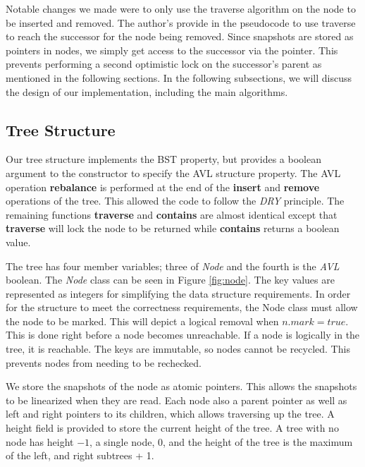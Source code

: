 \documentclass[conference]{IEEEtran}
\theoremstyle{definition}
\theoremstyle{theorem}
\begin{document}
Notable changes we made were to only use the traverse algorithm on the node to be inserted and removed. The author's provide in the pseudocode to use traverse to reach the successor for the node being removed. Since snapshots are stored as pointers in nodes, we simply get access to the successor via the pointer. This prevents performing a second optimistic lock on the successor's parent as mentioned in the following sections. In the following subsections, we will discuss the design of our implementation, including the main algorithms.

\subsection{Tree Structure}
Our tree structure implements the BST property, but provides a boolean argument to the constructor to specify the AVL structure property. The AVL operation \textbf{rebalance} is performed at the end of the \textbf{insert} and \textbf{remove} operations of the tree. This allowed the code to follow the \textit{DRY} principle. The remaining functions \textbf{traverse} and \textbf{contains} are almost identical except that \textbf{traverse} will lock the node to be returned while \textbf{contains} returns a boolean value.

The tree has four member variables; three of \textit{Node} and the fourth is the \textit{AVL} boolean. The \textit{Node} class can be seen in Figure \ref{fig:node}. The key values are represented as integers for simplifying the data structure requirements. In order for the structure to meet the correctness requirements, the Node class must allow the node to be marked. This will depict a logical removal when $n.mark = true$. This is done right before a node becomes unreachable. If a node is logically in the tree, it is reachable. The keys are immutable, so nodes cannot be recycled. This prevents nodes from needing to be rechecked.  

We store the snapshots of the node as atomic pointers. This allows the snapshots to be linearized when they are read. Each node also a parent pointer as well as left and right pointers to its children, which allows traversing up the tree. A height field is provided to store the current height of the tree. A tree with no node has height $-1$, a single node, 0, and the height of the tree is the maximum of the left, and right subtrees + 1.
\end{document}
